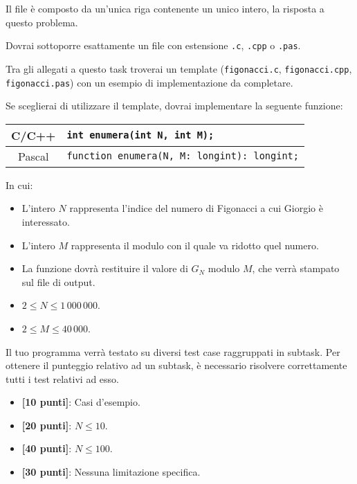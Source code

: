 \OutputFile
Il file \outputfile{} è composto da un'unica riga contenente un unico intero, la risposta a questo problema.

\Implementation
Dovrai sottoporre esattamente un file con estensione \texttt{.c}, \texttt{.cpp} o \texttt{.pas}.

\begin{warning}
Tra gli allegati a questo task troverai un template (\texttt{figonacci.c}, \texttt{figonacci.cpp}, \texttt{figonacci.pas}) con un esempio di implementazione da completare.
\end{warning}

Se sceglierai di utilizzare il template, dovrai implementare la seguente funzione:
\begin{center}\begin{tabularx}{\textwidth}{|c|X|}
\hline
C/C++  & \verb|int enumera(int N, int M);|\\
\hline
Pascal & \verb|function enumera(N, M: longint): longint;|\\
\hline
\end{tabularx}\end{center}
In cui:
\begin{itemize}[nolistsep]
  \item L'intero $N$ rappresenta l'indice del numero di Figonacci a cui Giorgio è interessato.
  \item L'intero $M$ rappresenta il modulo con il quale va ridotto quel numero.
  \item La funzione dovrà restituire il valore di $G_N$ modulo $M$, che verrà stampato sul file di output.
\end{itemize}

\pagebreak
\Constraints
\begin{itemize}[nolistsep, itemsep=2mm]
\item $2 \le N \le 1\,000\,000$.
\item $2 \le M \le 40\,000$.
\end{itemize}

\Scoring
Il tuo programma verrà testato su diversi test case raggruppati in subtask.
Per ottenere il punteggio relativo ad un subtask, è necessario risolvere
correttamente tutti i test relativi ad esso.

\begin{itemize}[nolistsep,itemsep=2mm]
  \item \textbf{ [10 punti]}: Casi d'esempio.
  \item \textbf{ [20 punti]}: $N \leq 10$.
  \item \textbf{ [40 punti]}: $N \leq 100$.
  \item \textbf{ [30 punti]}: Nessuna limitazione specifica.
\end{itemize}

